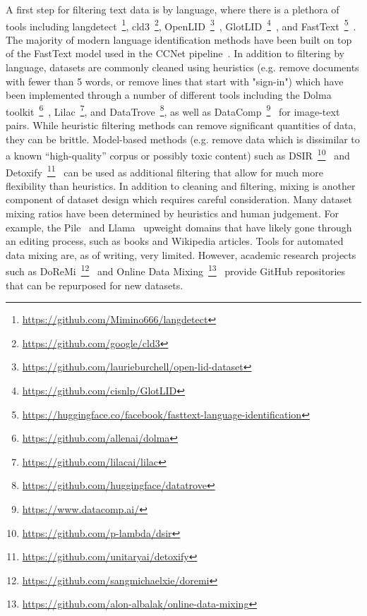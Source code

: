 A first step for filtering text data is by language, where there is a plethora of tools including langdetect~\footnote{\url{https://github.com/Mimino666/langdetect}}, cld3~\footnote{\url{https://github.com/google/cld3}}, OpenLID~\footnote{\url{https://github.com/laurieburchell/open-lid-dataset}}~\citep{Burchell_2023}, GlotLID~\footnote{\url{https://github.com/cisnlp/GlotLID}}~\citep{kargaran2023glotlid}, and FastText~\footnote{\url{https://huggingface.co/facebook/fasttext-language-identification}}~\citep{grave2018learning}. The majority of modern language identification methods have been built on top of the FastText model used in the CCNet pipeline~\citep{wenzek-etal-2020-ccnet}.
In addition to filtering by language, datasets are commonly cleaned using heuristics (e.g. remove documents with fewer than 5 words, or remove lines that start with "sign-in") which have been implemented through a number of different tools including the Dolma toolkit~\footnote{\url{https://github.com/allenai/dolma}}~\citep{dolma}, Lilac~\footnote{\url{https://github.com/lilacai/lilac}}, and DataTrove~\footnote{\url{https://github.com/huggingface/datatrove}}\citep{penedo2024datatrove}, as well as DataComp~\footnote{\url{https://www.datacomp.ai/}}~\citep{gadre2023datacomp} for image-text pairs.
While heuristic filtering methods can remove significant quantities of data, they can be brittle. Model-based methods (e.g. remove data which is dissimilar to a known ``high-quality'' corpus or possibly toxic content) such as DSIR~\footnote{\url{https://github.com/p-lambda/dsir}}~\citep{xie2023data} and Detoxify~\footnote{\url{https://github.com/unitaryai/detoxify}}~\citep{Hanu_Detoxify_2020} can be used as additional filtering that allow for much more flexibility than heuristics.
In addition to cleaning and filtering, mixing is another component of dataset design which requires careful consideration. Many dataset mixing ratios have been determined by heuristics and human judgement. For example, the Pile~\citep{gao2020pile} and Llama~\citep{touvron2023llama} upweight domains that have likely gone through an editing process, such as books and Wikipedia articles. Tools for automated data mixing are, as of writing, very limited. However, academic research projects such as DoReMi~\footnote{\url{https://github.com/sangmichaelxie/doremi}}~\citep{xie2023doremi} and Online Data Mixing~\footnote{\url{https://github.com/alon-albalak/online-data-mixing}}~\citep{albalak2023efficient} provide GitHub repositories that can be repurposed for new datasets.


